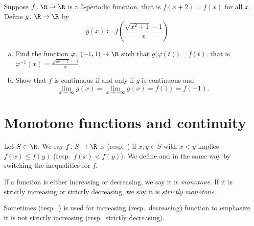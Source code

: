 \begin{exercise}
Suppose $f \colon \R \to \R$ is a 2-periodic function, that is $f(x +2) =
f(x)$ for all $x$.  Define $g \colon \R \to \R$ by 
\begin{equation*}
g(x) \coloneqq f\left(\frac{\sqrt{x^2+1}-1}{x}\right)
\end{equation*}
\begin{enumerate}[a)]
\item
Find the function $\varphi \colon (-1,1) \to \R$ such that
$g\bigl(\varphi(t)\bigr) = f(t)$, that is $\varphi^{-1}(x) = 
\frac{\sqrt{x^2+1}-1}{x}$.
\item
Show that $f$ is continuous if and only if $g$ is continuous and
\begin{equation*}
\lim_{x \to \infty} g(x) = 
\lim_{x \to -\infty} g(x) = 
f(1) = f(-1) .
\end{equation*}
\end{enumerate}
\end{exercise}


\sectionnewpage
\section{Monotone functions and continuity}
\label{sec:monotonefunc}



\begin{defn}
Let $S \subset \R$.
We say $f \colon S \to \R$ is \emph{}
(resp.\  \emph{}) if $x,y \in S$ with
$x < y$ implies $f(x) \leq f(y)$ (resp.\ $f(x) < f(y)$).
We define
\emph{} and
\emph{} in the same way by switching the
inequalities for $f$.

If a function is either increasing or decreasing, we say it is
\emph{monotone}.  If it is
strictly increasing or strictly decreasing, we say it is
\emph{strictly monotone}.
\end{defn}

Sometimes \emph{}
(resp.\ \emph{}) is used
for increasing (resp.\ decreasing) function to emphasize it is not
strictly increasing (resp.\ strictly decreasing).

